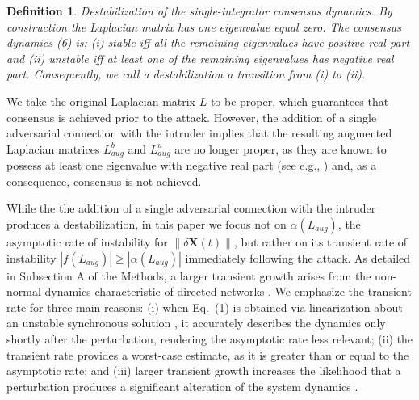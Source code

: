 \documentclass[%
 reprint,
 amsmath,amssymb,
 aip,
]{revtex4-2}
\def \bX {\pmb{X}}
\theoremstyle{italichead}
\newtheorem{definition}[theorem]{Definition}
\theoremstyle{definition}
\begin{document}
{{\begin{definition}\textit{{Destabilization of the single-integrator consensus dynamics.}}
By construction the Laplacian matrix has one eigenvalue equal zero. The consensus dynamics (6) is: (i) stable iff all the remaining eigenvalues have positive real part and (ii) unstable iff at least one of the remaining eigenvalues has negative real part. Consequently, we call a destabilization a transition from (i) to (ii).  
\end{definition}
\color{black}
We take the original Laplacian matrix $L$ to be proper, which guarantees that consensus is achieved prior to the attack. However, the addition of a single adversarial connection with the intruder implies that the resulting augmented Laplacian matrices $L_{aug}^b$ and $L_{aug}^u$ are no longer proper, as they are known to possess at least one eigenvalue with negative real part (see e.g., \cite{Chen2017spectral,ahmadizadeh2017eigenvalues}) and, as a consequence, consensus is not achieved. 




While the the addition of a single adversarial connection with the intruder produces a destabilization, in this paper we focus not on $\alpha(L_{aug})$, the asymptotic rate of instability for $\| \delta \bX(t) \|$, but rather on its transient rate of instability $|f(L_{aug})| \geq |\alpha(L_{aug})|$ immediately following the attack. As detailed in Subsection A of the Methods, a larger transient growth arises from the non-normal dynamics  characteristic of directed networks \cite{Asllani2018Structure, trefethen1991pseudospectra}. We emphasize the transient rate for three main reasons: (i) when Eq.~(1) is obtained via linearization about an unstable synchronous solution \cite{nazerian2024efficiency}, it accurately describes the dynamics only shortly after the perturbation, rendering the asymptotic rate less relevant; (ii) the transient rate provides a worst-case estimate, as it is greater than or equal to the asymptotic rate; and (iii) larger transient growth increases the likelihood that a perturbation produces a significant alteration of the system dynamics \cite{asllani2018topological, Asllani2018Structure, MUOLO2019Patterns, muolo2020synchronization, nazerian2024efficiency}.

}}
\end{document}
